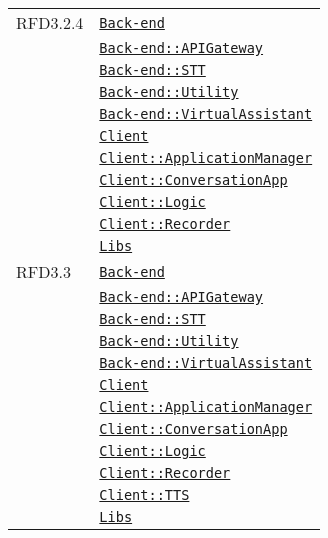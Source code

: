 \begin{longtable}{|>{\centering}m{3cm}|m{10cm}<{\centering}|}
RFD3.2.4 & \hyperref[Back-end]{\texttt{Back-end}}\\
& \hyperref[Back-end::APIGateway]{\texttt{Back-end::APIGateway}}\\
& \hyperref[Back-end::STT]{\texttt{Back-end::STT}}\\
& \hyperref[Back-end::Utility]{\texttt{Back-end::Utility}}\\
& \hyperref[Back-end::VirtualAssistant]{\texttt{Back-end::VirtualAssistant}}\\
& \hyperref[Client]{\texttt{Client}}\\
& \hyperref[Client::ApplicationManager]{\texttt{Client::ApplicationManager}}\\
& \hyperref[Client::ConversationApp]{\texttt{Client::ConversationApp}}\\
& \hyperref[Client::Logic]{\texttt{Client::Logic}}\\
& \hyperref[Client::Recorder]{\texttt{Client::Recorder}}\\
& \hyperref[Libs]{\texttt{Libs}}\\ \hline

RFD3.3 & \hyperref[Back-end]{\texttt{Back-end}}\\
& \hyperref[Back-end::APIGateway]{\texttt{Back-end::APIGateway}}\\
& \hyperref[Back-end::STT]{\texttt{Back-end::STT}}\\
& \hyperref[Back-end::Utility]{\texttt{Back-end::Utility}}\\
& \hyperref[Back-end::VirtualAssistant]{\texttt{Back-end::VirtualAssistant}}\\
& \hyperref[Client]{\texttt{Client}}\\
& \hyperref[Client::ApplicationManager]{\texttt{Client::ApplicationManager}}\\
& \hyperref[Client::ConversationApp]{\texttt{Client::ConversationApp}}\\
& \hyperref[Client::Logic]{\texttt{Client::Logic}}\\
& \hyperref[Client::Recorder]{\texttt{Client::Recorder}}\\
& \hyperref[Client::TTS]{\texttt{Client::TTS}}\\
& \hyperref[Libs]{\texttt{Libs}}\\ \hline


\end{longtable}
